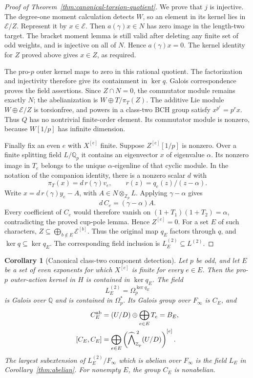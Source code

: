 \documentclass[11pt]{article}
\newtheorem{corollary}[theorem]{Corollary}
\theoremstyle{definition}\newtheorem{definition}[theorem]{Definition}
\begin{document}
\begin{proof}[Proof of Theorem~\ref{thm:canonical-torsion-quotient}]
We prove that $j$ is injective. The degree-one moment
calculation detects $W$, so an element in its kernel lies
in $\mathcal E/Z$. Represent it by $x\in\mathcal E$.
Then $a(\gamma)x\in N$ has zero image in the length-two
target. The bracket moment lemma is still valid after
deleting any finite set of odd weights, and is injective
on all of $N$. Hence $a(\gamma)x=0$. The kernel identity
for $Z$ proved above gives $x\in Z$, as required.

The pro-$p$ outer kernel maps to zero in this rational
quotient. The factorization and injectivity therefore give
its containment in $\ker q$. Galois correspondence proves
the field assertions. Since $Z\cap N=0$, the commutator
module remains exactly $N$; the abelianization is
$W\oplus T/\pi_T(Z)$. The additive Lie module
$W\oplus\mathcal E/Z$ is torsionfree, and powers in a
class-two BCH group satisfy $x^{p^r}=p^rx$. Thus $Q$ has
no nontrivial finite-order element. Its commutator module
is nonzero, because $W[1/p]$ has infinite dimension.

Finally fix an even $e$ with $X^{[e]}$ finite.
Suppose $Z^{[e]}[1/p]$ is nonzero. Over a finite splitting
field $L/\mathbb Q_p$ it contains an eigenvector $x$ of eigenvalue $\alpha$.
Its nonzero image in $T_e$ belongs to the unique
$\alpha$-eigenline of that cyclic module. In the notation
of the companion identity, there is a nonzero scalar $d$
with
\[
 \pi_T(x)=d\,r(\gamma)v_e,\qquad
 r(z)=q_e(z)/(z-\alpha).
\]
Write $x=d\,r(\gamma)y_e-A$, with $A\in N\otimes_{\mathbb Z_p}L$.
Applying $\gamma-\alpha$ gives
\[
                         d\,C_e=(\gamma-\alpha)A.
\]
Every coefficient of $C_e$ would therefore vanish on
$(1+T_1)(1+T_2)=\alpha$, contradicting the proved cup-pole
lemma. Hence $Z^{[e]}=0$. For a set $E$ of such characters,
$Z\subseteq\bigoplus_{b\notin E}\mathcal E^{[b]}$.
Thus the original map $q_E$ factors through $q$, and
$\ker q\subseteq\ker q_E$. The corresponding field
inclusion is $L_E^{(2)}\subseteq L^{(2)}$.
\end{proof}



\begin{corollary}[Canonical class-two component detection]
\label{thm:class-two-components}
Let $p$ be odd, and let $E$ be a set of even exponents for which
$X^{[e]}$ is finite for every $e\in E$.
Then the pro-$p$ outer-action kernel in $H$ is contained
in $\ker q_E$.  The field
\[
 L_E^{(2)}=\Omega_p^{\ker q_E}
\]
is Galois over $\mathbb Q$ and is contained in $\Omega_p^*$.
Its Galois group over $F_\infty$ is $C_E$, and
\begin{align*}
 C_E^{\rm ab}&=(U/D)\oplus\bigoplus_{e\in E}T_e=B_E,\\
 [C_E,C_E]&=\bigoplus_{e\in E}
       \left(\widehat{\bigwedge}^{\,2}_{\mathbb Z_p}(U/D)\right)^{[e]}.
\end{align*}
The largest subextension of $L_E^{(2)}/F_\infty$ which is
abelian over $F_\infty$ is the field $L_E$ in
Corollary~\ref{thm:abelian}.  For nonempty $E$, the group $C_E$
is nonabelian.
\end{corollary}
\end{document}
